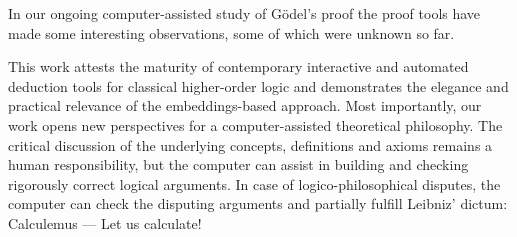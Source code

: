 \documentclass{easychair}
\begin{document}
In our ongoing computer-assisted study of G\"odel's proof the proof
tools have made some interesting observations, some of which were 
unknown so far.

This work attests the maturity of contemporary interactive and
automated deduction tools for classical higher-order logic and
demonstrates the elegance and practical relevance of the
embeddings-based approach.  Most importantly, our work opens new
perspectives for a computer-assisted theoretical philosophy.  The
critical discussion of the underlying concepts, definitions and axioms
remains a human responsibility, but the computer can assist in
building and checking rigorously correct logical arguments. In case of
logico-philosophical disputes, the computer can check the disputing
arguments and partially fulfill Leibniz' dictum: Calculemus --- Let us
calculate!

\small
\end{document}

